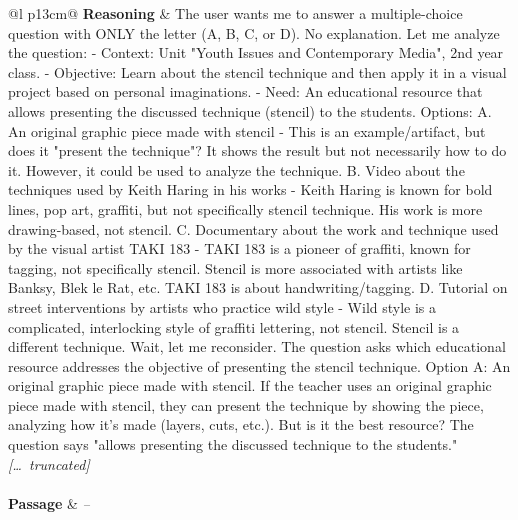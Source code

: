 \begin{longtable}{@{}l p{13cm}@{}}
  \textbf{Reasoning} & The user wants me to answer a multiple-choice question with ONLY the letter (A, B, C, or D). No explanation. \newline Let me analyze the question: \newline - Context: Unit "Youth Issues and Contemporary Media", 2nd year class. \newline - Objective: Learn about the stencil technique and then apply it in a visual project based on personal imaginations. \newline - Need: An educational resource that allows presenting the discussed technique (stencil) to the students. \newline Options: \newline A. An original graphic piece made with stencil - This is an example/artifact, but does it "present the technique"? It shows the result but not necessarily how to do it. However, it could be used to analyze the technique. \newline B. Video about the techniques used by Keith Haring in his works - Keith Haring is known for bold lines, pop art, graffiti, but not specifically stencil technique. His work is more drawing-based, not stencil. \newline C. Documentary about the work and technique used by the visual artist TAKI 183 - TAKI 183 is a pioneer of graffiti, known for tagging, not specifically stencil. Stencil is more associated with artists like Banksy, Blek le Rat, etc. TAKI 183 is about handwriting/tagging. \newline D. Tutorial on street interventions by artists who practice wild style - Wild style is a complicated, interlocking style of graffiti lettering, not stencil. Stencil is a different technique. \newline Wait, let me reconsider. The question asks which educational resource addresses the objective of presenting the stencil technique. \newline Option A: An original graphic piece made with stencil. If the teacher uses an original graphic piece made with stencil, they can present the technique by showing the piece, analyzing how it's made (layers, cuts, etc.). But is it the best resource? The question says "allows presenting the discussed technique to the students." \newline \textit{[\ldots\ truncated]}  \\
  \midrule
   \\
  \textbf{Passage}   & \textit{--}    \\

\end{longtable}
